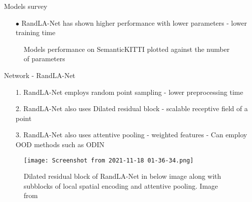 \documentclass[aspectratio=169]{beamer}
\begin{document}
\begin{frame}{Models survey}
    \begin{itemize}
        \item[$\bullet$] RandLA-Net has shown higher performance with lower parameters - lower training time
    \end{itemize}
    \begin{figure}
        \centering
        
        \caption{Models performance on SemanticKITTI plotted against the number of parameters}       
    \end{figure}
\end{frame}

\begin{frame}{Network - RandLA-Net}
    \begin{itemize}
        \item[1.] RandLA-Net employs random point sampling - lower preprocessing time
        \item[2.] RandLA-Net also uses Dilated residual block - scalable receptive field of a point
        \item[3.] RandLA-Net also uses attentive pooling - weighted features - Can employ OOD methods such as ODIN
    \end{itemize}
    \begin{figure}
        \centering
        \texttt{[image: Screenshot from 2021-11-18 01-36-34.png]}
        \caption{Dilated residual block of RandLA-Net in below image along with subblocks of local spatial encoding and attentive pooling. Image from }
        
    \end{figure}
\end{frame}

\end{document}
